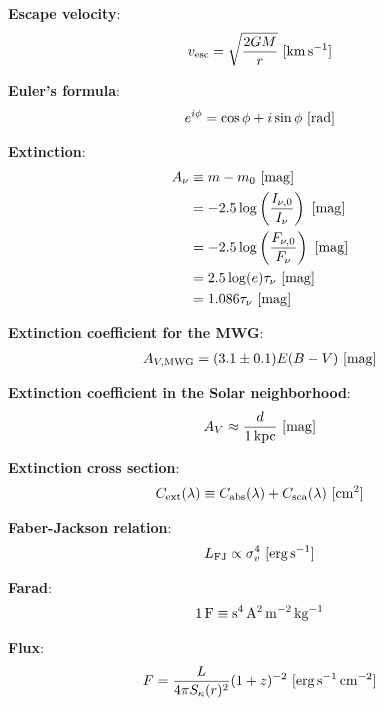 \documentclass[a4paper,10pt]{article}
\begin{document}
{\noindent}\textbf{Escape velocity}:
\begin{align*}
    v_\mathrm{esc} = \sqrt{\frac{2GM}{r}} ~ [{\rm km\,s^{-1}}]
\end{align*}

{\noindent}\textbf{Euler's formula}:
\begin{align*}
    e^{i\phi} = \cos\phi + i\sin\phi ~ [{\rm rad}]
\end{align*}

{\noindent}\textbf{Extinction}:
\begin{align*}
    A_\nu &\equiv m-m_0 ~ [{\rm mag}] \\
          & = -2.5\log\left(\frac{I_{\nu,0}}{I_\nu}\right) ~ [{\rm mag}] \\
          & = -2.5\log\left(\frac{F_{\nu,0}}{F_\nu}\right) ~ [{\rm mag}] \\
          &= 2.5\log(e)\tau_\nu ~ [{\rm mag}] \\
          &= 1.086\tau_\nu ~ [{\rm mag}]
\end{align*}

{\noindent}\textbf{Extinction coefficient for the MWG}:
\begin{align*}
    A_{V,\mathrm{MWG}} = (3.1\pm0.1)E(B-V) ~ [{\rm mag}]
\end{align*}

{\noindent}\textbf{Extinction coefficient in the Solar neighborhood}:
\begin{align*}
    A_V \approx \frac{d}{1\,{\rm kpc}} ~ [{\rm mag}]
\end{align*}

{\noindent}\textbf{Extinction cross section}:
\begin{align*}
    C_{\rm ext}(\lambda) \equiv C_{\rm abs}(\lambda)+C_{\rm sca}(\lambda) ~ [{\rm cm^2}]
\end{align*}

{\noindent}\textbf{Faber-Jackson relation}:
\begin{align*}
    L_\mathrm{FJ} \propto \sigma_v^4 ~ [{\rm erg\,s^{-1}}]
\end{align*}

{\noindent}\textbf{Farad}:
\begin{align*}
    {\rm 1\,F \equiv s^4\,A^2\,m^{-2}\,kg^{-1}}
\end{align*}

{\noindent}\textbf{Flux}:
\begin{align*}
    F = \frac{L}{4\pi S_\kappa(r)^2}(1+z)^{-2} ~ [{\rm erg\,s^{-1}\,cm^{-2}}]
\end{align*}
\end{document}
